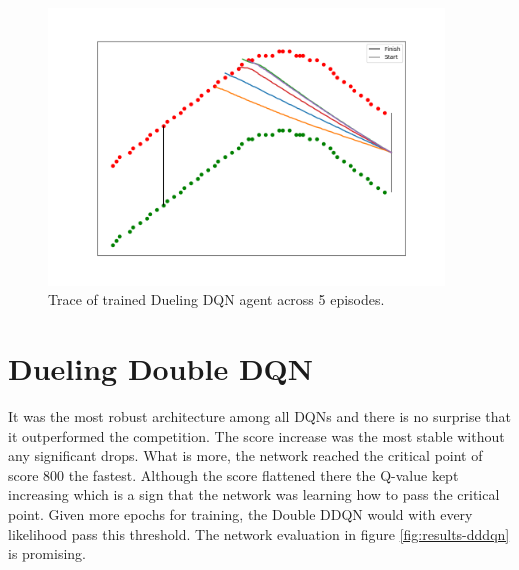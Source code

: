 \begin{figure}[h]
    \centering
    \includegraphics[width=10.5cm]{img/trace_dueling_dqn.png}
    \caption{Trace of trained Dueling DQN agent across 5 episodes.}
    \label{fig:trace-dueling-dqn}
\end{figure}

\newpage

\section{Dueling Double DQN}
\label{sec:results-dueling-double-dqn}

It was the most robust architecture among all DQNs and there is no surprise that it outperformed the competition. The score increase
was the most stable without any significant drops. What is more, the network reached the critical point of score 800 the fastest. Although
the score flattened there the Q-value kept increasing which is a sign that the network was learning how to pass the critical point. Given more epochs for training, the Double DDQN would with every likelihood pass this threshold. The network evaluation in figure \ref{fig:results-dddqn} is promising.

